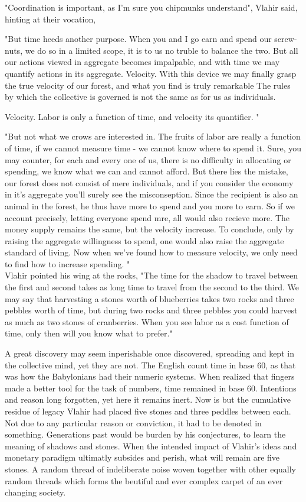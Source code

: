 \documentclass[smalldemyvopaper,11pt,twoside,onecolumn,openright,extrafontsizes]{memoir}
\begin{document}
"Coordination is important, as I'm sure you chipmunks understand", Vlahir said, hinting at their vocation, 

"But time heeds another purpose. When you and I go earn and spend our screw-nuts, we do so in a limited scope, it is to us no truble to balance the two. But all our actions viewed in aggregate becomes impalpable, and with time we may quantify actions in its aggregate. Velocity. With this device we may finally grasp the true velocity of our forest, and what you find is truly remarkable 
The rules by which the collective is governed is not the same as for us as individuals. 

 Velocity. Labor is only a function of time, and velocity its quantifier. "

"But not what we crows are interested in. The fruits of labor are really a function of time, if we cannot measure time - we cannot know where to spend it. Sure, you may counter, for each and every one of us, there is no difficulty in allocating or spending, we know what we can and cannot afford. But there lies the mistake, our forest does not consist of mere individuals, and if you consider the economy in it's aggregate you'll surely see the misconseption. Since the recipient is also an animal in the forest, he thus have more to spend and you more to earn. So if we account precisely, letting everyone spend mre, all would also recieve more. The money supply remains the same, but the velocity increase. To conclude, only by raising the aggregate willingness to spend, one would also raise the aggregate standard of living. Now when we've found how to measure velocity, we only need to find how to increase spending. " \\ 

Vlahir pointed his wing at the rocks, "The time for the shadow to travel between the first and second takes as long time to travel from the second to the third. We may say that harvesting a stones worth of blueberries takes two rocks and three pebbles worth of time, but during two rocks and three pebbles you could harvest as much as two stones of cranberries. When you see labor as a cost function of time, only then will you know what to prefer." %

A great discovery may seem inperishable once discovered, spreading and kept in the collective mind, yet they are not. The English count time in base 60, as that was how the Babylonians had their numeric systems. When realized that fingers made a better tool for the task of numbers, time remained in base 60. Intentions and reason long forgotten, yet here it remains inert. Now is but the cumulative residue of legacy %
Vlahir had placed five stones and three peddles between each. Not due to any particular reason or conviction, it had to be denoted in something. Generations past would be burden by his conjectures, to learn the meaning of shadows and stones. When the intended impact of Vlahir's ideas and monetary paradigm ultimatly subsides and perish, what will remain are five stones. A random thread of indeliberate noise woven together with other equally random threads which forms the beutiful and ever complex carpet of an ever changing society.
\end{document}
